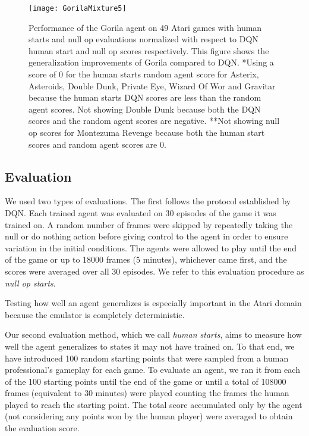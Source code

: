 \documentclass{article}
\begin{document}
\begin{figure*} [!ht]
	\vskip -0.1in
	\begin{center}
		\centerline{\texttt{[image: GorilaMixture5]}}
		\caption{Performance of the Gorila agent on 49 Atari games with human starts and null op evaluations normalized with respect to DQN human start and null op scores respectively. This figure shows the generalization improvements of Gorila compared to DQN. *Using a score of 0 for the human starts random agent score for Asterix, Asteroids, Double Dunk, Private Eye, Wizard Of Wor and Gravitar because the human starts DQN scores are less than the random agent scores. Not showing Double Dunk because both the DQN scores and the random agent scores are negative. **Not showing null op scores for Montezuma Revenge because both the human start scores and random agent scores are 0.
		}
		\label{fig:humanstarts1}
	\end{center}
	\vskip -0.2in
\end{figure*}

\subsection{Evaluation}

We used two types of evaluations.
The first follows the protocol established by DQN. Each trained agent was evaluated on 30 episodes of the game it was trained on.
A random  number of frames were skipped by repeatedly taking the null or do nothing action before giving control to the agent in order to ensure variation in the initial conditions.
The agents were allowed to play until the end of the game or up to 18000 frames (5 minutes), whichever came first, and the scores were averaged over all 30 episodes. We refer to this evaluation procedure as {\it null op starts}.

Testing how well an agent generalizes is especially important in the Atari domain because the emulator is completely deterministic.

Our second evaluation method, which we call {\it human starts}, aims to measure how well the agent generalizes to states it may not have trained on. To that end, we have introduced 100 random starting points that were sampled from a human professional's gameplay for each game.
To evaluate an agent, we ran it from each of the 100 starting points until the end of the game or until a total of 108000 frames (equivalent to 30 minutes) were played counting the frames the human played to reach the starting point.
The total score accumulated only by the agent (not considering any points won by the human player) were averaged to obtain the evaluation score.
\end{document}

